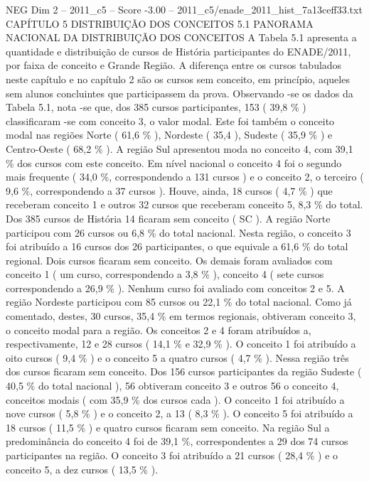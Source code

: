 \begin{textsample}{NEG Dim 2 – 2011\_c5 – Score -3.00 – 2011\_c5/enade\_2011\_hist\_7a13ceff33.txt}  \label{ex:f2_neg_084}
CAPÍTULO 5 DISTRIBUIÇÃO DOS CONCEITOS 5.1 PANORAMA NACIONAL DA DISTRIBUIÇÃO DOS CONCEITOS A Tabela 5.1 apresenta a quantidade e distribuição de cursos de História participantes do ENADE/2011, por faixa de conceito e Grande Região.
A diferença entre os cursos tabulados neste capítulo e no capítulo 2 são os cursos sem conceito, em princípio, aqueles sem alunos concluintes que participassem da prova.
Observando -se os dados da Tabela 5.1, nota -se que, dos 385 cursos participantes, 153 ( 39,8 \% ) classificaram -se com conceito 3, o valor modal.
Este foi também o conceito modal nas regiões Norte ( 61,6 \% ), Nordeste ( 35,4 ), Sudeste ( 35,9 \% ) e Centro-Oeste ( 68,2 \% ).
A região Sul apresentou moda no conceito 4, com 39,1 \% dos cursos com este conceito.
Em nível nacional o conceito 4 foi o segundo mais frequente ( 34,0 \%, correspondendo a 131 cursos ) e o conceito 2, o terceiro ( 9,6 \%, correspondendo a 37 cursos ).
Houve, ainda, 18 cursos ( 4,7 \% ) que receberam conceito 1 e outros 32 cursos que receberam conceito 5, 8,3 \% do total.
Dos 385 cursos de História 14 ficaram sem conceito ( SC ).
A região Norte participou com 26 cursos ou 6,8 \% do total nacional.
Nesta região, o conceito 3 foi atribuído a 16 cursos dos 26 participantes, o que equivale a 61,6 \% do total regional.
Dois cursos ficaram sem conceito.
Os demais foram avaliados com conceito 1 ( um curso, correspondendo a 3,8 \% ), conceito 4 ( sete cursos correspondendo a 26,9 \% ).
Nenhum curso foi avaliado com conceitos 2 e 5.
A região Nordeste participou com 85 cursos ou 22,1 \% do total nacional.
Como já comentado, destes, 30 cursos, 35,4 \% em termos regionais, obtiveram conceito 3, o conceito modal para a região.
Os conceitos 2 e 4 foram atribuídos a, respectivamente, 12 e 28 cursos ( 14,1 \% e 32,9 \% ).
O conceito 1 foi atribuído a oito cursos ( 9,4 \% ) e o conceito 5 a quatro cursos ( 4,7 \% ).
Nessa região três dos cursos ficaram sem conceito.
Dos 156 cursos participantes da região Sudeste ( 40,5 \% do total nacional ), 56 obtiveram conceito 3 e outros 56 o conceito 4, conceitos modais ( com 35,9 \% dos cursos cada ).
O conceito 1 foi atribuído a nove cursos ( 5,8 \% ) e o conceito 2, a 13 ( 8,3 \% ).
O conceito 5 foi atribuído a 18 cursos ( 11,5 \% ) e quatro cursos ficaram sem conceito.
Na região Sul a predominância do conceito 4 foi de 39,1 \%, correspondentes a 29 dos 74 cursos participantes na região.
O conceito 3 foi atribuído a 21 cursos ( 28,4 \% ) e o conceito 5, a dez cursos ( 13,5 \% ).

\end{textsample}
